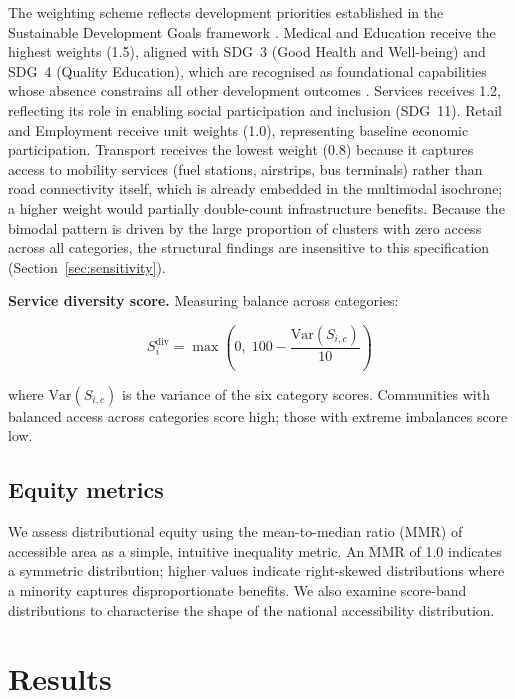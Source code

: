 \documentclass[review,3p,authoryear]{elsarticle}
\begin{document}
The weighting scheme reflects development priorities established in the Sustainable Development Goals framework \citep{un2020sdg}. Medical and Education receive the highest weights (1.5), aligned with SDG~3 (Good Health and Well-being) and SDG~4 (Quality Education), which are recognised as foundational capabilities whose absence constrains all other development outcomes \citep{sen1999, pereira2017}. Services receives 1.2, reflecting its role in enabling social participation and inclusion (SDG~11). Retail and Employment receive unit weights (1.0), representing baseline economic participation. Transport receives the lowest weight (0.8) because it captures access to mobility services (fuel stations, airstrips, bus terminals) rather than road connectivity itself, which is already embedded in the multimodal isochrone; a higher weight would partially double-count infrastructure benefits. Because the bimodal pattern is driven by the large proportion of clusters with zero access across all categories, the structural findings are insensitive to this specification (Section~\ref{sec:sensitivity}).

\textbf{Service diversity score.} Measuring balance across categories:

\begin{equation}
S_i^{\text{div}} = \max\left(0,\; 100 - \frac{\text{Var}(S_{i,c})}{10}\right)
\label{eq:diversity}
\end{equation}

\noindent where $\text{Var}(S_{i,c})$ is the variance of the six category scores. Communities with balanced access across categories score high; those with extreme imbalances score low.

\subsection{Equity metrics}

We assess distributional equity using the mean-to-median ratio (MMR) of accessible area as a simple, intuitive inequality metric. An MMR of 1.0 indicates a symmetric distribution; higher values indicate right-skewed distributions where a minority captures disproportionate benefits. We also examine score-band distributions to characterise the shape of the national accessibility distribution.

\section{Results}
\label{sec:results}
\end{document}
